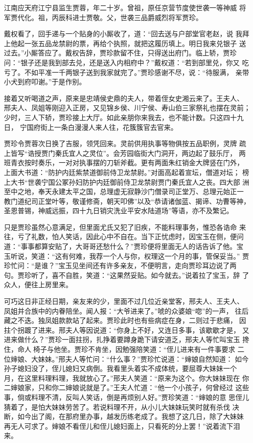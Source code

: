 江南应天府江宁县监生贾蓉，年二十岁。曾祖，原任京营节度使世袭一等神威
将军贾代化。祖，丙辰科进士贾敬。父，世袭三品爵威烈将军贾珍。

戴权看了，回手递与一个贴身的小厮收了，道：“回去送与户部堂官老赵，说
我拜上他起一张五品龙禁尉的票，再给个执照，就把这履历填上。明日我来兑银子
送过去。”小厮答应了。戴权告辞，贾珍款留不住，只得送出府门。临上轿，贾珍
问：“银子还是我到部去兑，还是送入内相府中？”戴权道：“若到部里兑，你又
吃亏了。不如平准一千两银子送到我家就完了。”贾珍感谢不尽，说：“待服满，
亲带小犬到府叩谢。”于是作别。

接着又听喝道之声，原来是忠靖侯史鼎的夫人，带着侄女史湘云来了。王夫人、
邢夫人、凤姐等刚迎入正房，又见锦乡侯、川宁侯、寿山伯三家祭礼也摆在灵前；
少时，三人下轿，贾珍接上大厅。如此亲朋你来我去，也不能计数。只这四十九日，
宁国府街上一条白漫漫人来人往，花簇簇官去官来。

贾珍令贾蓉次日换了吉服，领凭回来。灵前供用执事等物俱按五品职例，灵牌
疏上皆写“诰授贾门秦氏宜人之灵位”。会芳园临街大门洞开，两边起了鼓乐厅，
两班青衣按时奏乐，一对对执事摆的刀斩斧截。更有两面朱红销金大牌竖在门外，
上面大书道：“防护内廷紫禁道御前侍卫龙禁尉。”对面高起着宣坛，僧道对坛；
榜上大书“世袭宁国公冢孙妇防护内廷御前侍卫龙禁尉贾门秦氏宜人之丧。四大部
洲至中之地，奉天永建太平之国，总理虚无寂静沙门僧录司正堂万、总理元始正一
教门道纪司正堂叶等，敬谨修斋，朝天叩佛”以及“恭请诸伽蓝、揭谛、功曹等神，
圣恩普锡，神威远振，四十九日销灾洗业平安水陆道场”等语，亦不及繁记。

只是贾珍虽然心意满足，但里面尤氏又犯了旧疾，不能料理事务，惟恐各诰命
来往，亏了礼数，怕人笑话，因此心中不自在。当下正忧虑时，因宝玉在侧，便问
道：“事事都算安贴了，大哥哥还愁什么？”贾珍便将里面无人的话告诉了他。宝
玉听说，笑道：“这有何难，我荐一个人与你，权理这一个月的事，管保妥当。”
贾珍忙问：“是谁？”宝玉见坐间还有许多亲友，不便明言，走向贾珍耳边说了两
句。贾珍听了，喜不自胜，笑道：“这果然妥贴。如今就去。”说着拉了宝玉，辞
了众人，便往上房里来。

可巧这日非正经日期，亲友来的少，里面不过几位近亲堂客，邢夫人、王夫人、
凤姐并合族中的内眷陪坐。闻人报：“大爷进来了。”唬的众婆娘“唿”的一声，
往后藏之不迭。独凤姐款款站了起来。贾珍此时也有些病症在身，二则过于悲痛，
因拄个拐踱了进来。邢夫人等因说道：“你身上不好，又连日多事，该歇歇才是，
又进来做什么？”贾珍一面拄拐，扎挣着要蹲身跪下请安道乏，邢夫人等忙叫宝玉
搀住，命人椅子与他坐。贾珍不肯坐，因勉强陪笑道：“侄儿进来有一件事要求
二位婶娘、大妹妹。”邢夫人等忙问：“什么事？”贾珍忙说道：“婶娘自然知道：
如今孙子媳妇没了，侄儿媳妇又病倒。我看里头着实不成体统，要屈尊大妹妹一个
月，在这里料理料理，我就放心了。”邢夫人笑道：“原来为这个。你大妹妹现在
你二婶娘家，只和你二婶娘说就是了。”王夫人忙道：“他一个小孩子，何曾经过
这些事，倘或料理不清，反叫人笑话，倒是再烦别人好。”贾珍笑道：“婶娘的意
思侄儿猜着了，是怕大妹妹劳苦了。若说料理不开，从小儿大妹妹玩笑时就有杀伐
决断，如今出了阁，在那府里办事，越发历练老成了。我想了这几日，除了大妹妹
再无人可求了。婶娘不看侄儿和侄儿媳妇面上，只看死的分上罢！”说着流下泪来。

